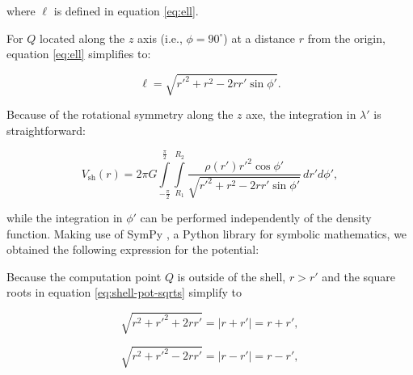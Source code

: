 \documentclass[extra]{gji}
\begin{document}
\noindent where $\ell$ is defined in equation \ref{eq:ell}.

For $Q$ located along the $z$ axis (i.e., $\phi=90^\circ$) at a distance $r$ from the
origin, equation \ref{eq:ell} simplifies to:

\begin{equation}
    \ell = \sqrt{r'^2 + r^2 - 2 r r' \sin\phi'}.
\end{equation}

\noindent
Because of the rotational symmetry along the $z$ axe, the integration in $\lambda'$ is
straightforward:

\begin{equation}
    V_\text{sh}(r) = 2\pi G
    \int\limits_{-\frac{\pi}{2}}^\frac{\pi}{2}
    \int\limits_{R_1}^{R_2}
    \frac{\rho(r') {r'}^2 \cos\phi'}{\sqrt{r'^2 + r^2 - 2 r r' \sin\phi'}}
    \, dr' d\phi',
\end{equation}

\noindent
while the integration in $\phi'$ can be performed independently of the density function.
Making use of SymPy \citep{sympy2017}, a Python library for symbolic mathematics, we
obtained the following expression for the potential:


Because the computation point $Q$ is outside of the shell, $r > r'$ and the square roots
in equation \ref{eq:shell-pot-sqrts} simplify to

\begin{equation}
    \sqrt{r^2 + r'^2 + 2rr'} = |r + r'| = r + r',
\end{equation}

\begin{equation}
    \sqrt{r^2 + r'^2 - 2rr'} = |r - r'| = r - r',
\end{equation}
\end{document}
